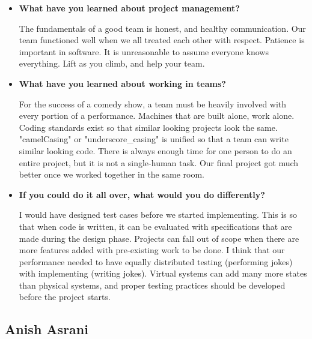 \documentclass[onecolumn, draftclsnofoot,10pt, compsoc]{IEEEtran}
\begin{document}
\begin{itemize}
    
        
\item{\textbf{What have you learned about project management?}}

    The fundamentals of a good team is honest, and healthy communication.
    Our team functioned well when we all treated each other with respect.
    Patience is important in software. It is unreasonable to assume everyone knows everything.
    Lift as you climb, and help your team.


\item{\textbf{What have you learned about working in teams?}}

        For the success of a comedy show, a team must be heavily involved with every portion of a performance.
        Machines that are built alone, work alone. Coding standards exist so that similar looking projects look the same.
        "camelCasing" or "underscore_casing" is unified so that a team can write similar looking code.
        There is always enough time for one person to do an entire project, but it is not a single-human task.     
        Our final project got much better once we worked together in the same room.   


\item{\textbf{If you could do it all over, what would you do differently?}}

    I would have designed test cases before we started implementing. 
    This is so that when code is written, it can be evaluated with specifications that are made during the design phase.
    Projects can fall out of scope when there are more features added with pre-existing work to be done.
    I think that our performance needed to have equally distributed testing (performing jokes) with implementing (writing jokes).
    Virtual systems can add many more states than physical systems, and proper testing practices should be developed before the project starts.

      
\end{itemize}  
    
    
    

    


\pagebreak

\subsection{Anish Asrani}
\end{document}
